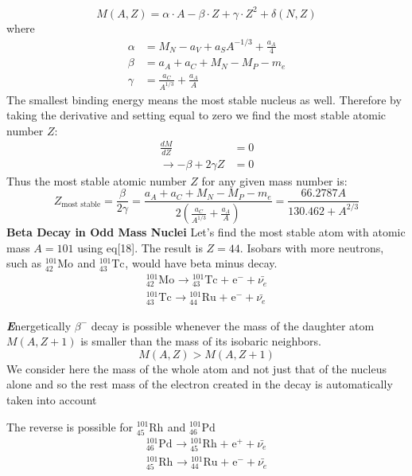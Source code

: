 \documentclass[10pt,a4paper]{article}
\newenvironment{callout}
	{\begin{calloutbox}\color{charcoal}\textbf\textit}
	{\end{calloutbox}}
\newcommand{\ch}[5]{{}^{#2}_{#3}\!\text{#1}^{#4}_{#5}}
\begin{document}
\begin{equation}
    M(A,Z) = \alpha\cdot A - \beta\cdot Z + \gamma \cdot Z^2 + \delta(N,Z)
\end{equation}
where
\begin{align*}
    \alpha &= M_N -a_V +a_S A^{-1/3} + \frac{a_A}{4}\\
    \beta  &= a_A + a_C + M_N - M_P- m_e\\
    \gamma &= \frac{a_C}{A^{1/3}} + \frac{a_A}{A} 
\end{align*}
The smallest binding energy means the most stable nucleus as well. Therefore by taking the derivative and setting equal to zero we find the most stable atomic number $Z$:
\begin{align*}
    \frac{dM}{dZ} &= 0 \\
    \rightarrow -\beta + 2\gamma Z &= 0
\end{align*}
Thus the most stable atomic number $Z$ for any given mass number is:
\begin{equation}
    \boxed{
        Z_{\text{most stable}} = \frac{\beta}{2\gamma} = \frac{a_A + a_C + M_N - M_P- m_e}{2\left(\frac{a_C}{A^{1/3}} + \frac{a_A}{A}\right)} = \frac{66.2787 A}{130.462 + A^{2/3} }
    }
\end{equation}
\textbf{Beta Decay in Odd Mass Nuclei}
Let's find the most stable atom with atomic mass $A=101$ using eq[18]. The result is $Z = 44$. Isobars with more neutrons, such as $\ch{Mo}{101}{42}{}{}$ and $\ch{Tc}{101}{43}{}{}$, would have beta minus decay.
\begin{align}
    \ch{Mo}{101}{42}{}{}\rightarrow \ch{Tc}{101}{43}{}{} + \ch{e}{}{}{-}{}+\bar{\nu_e}\\
    \ch{Tc}{101}{43}{}{}\rightarrow \ch{Ru}{101}{44}{}{} + \ch{e}{}{}{-}{} + \bar{\nu_e}
\end{align}

\begin{callout}
    Energetically $\beta^-$ decay is possible whenever the mass of the daughter atom $M(A,Z+1)$ is smaller than the mass of its isobaric neighbors.
    $$
    M(A,Z)> M(A, Z+1)
    $$
    We consider here the mass of the whole atom and not just that of  the nucleus alone and so the rest mass of the electron created in the decay is automatically taken into account
\end{callout}

The reverse is possible for $\ch{Rh}{101}{45}{}{}$ and $\ch{Pd}{101}{46}{}{}$
\begin{align}
    \ch{Pd}{101}{46}{}{}\rightarrow \ch{Rh}{101}{45}{}{} + \ch{e}{}{}{+}{}+\bar{\nu_e}\\
    \ch{Rh}{101}{45}{}{}\rightarrow \ch{Ru}{101}{44}{}{} + \ch{e}{}{}{-}{} + \bar{\nu_e}
\end{align}
\end{document}

